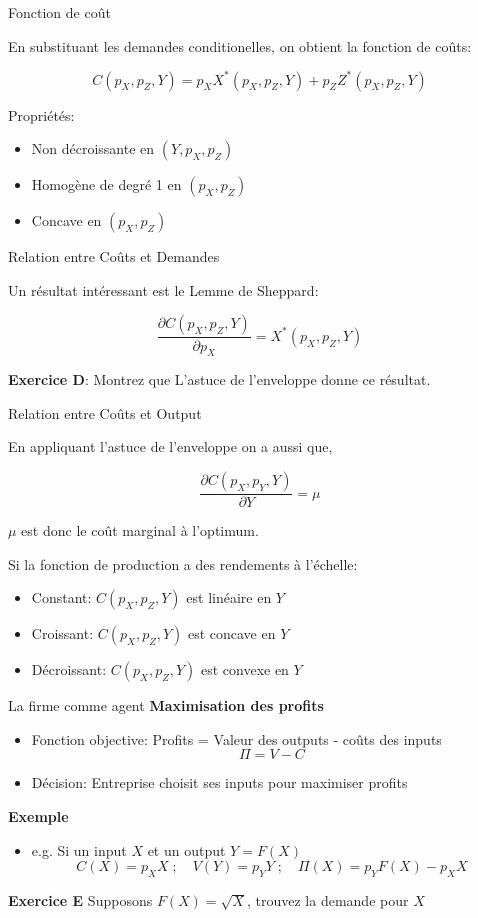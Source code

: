 \documentclass[handout]{beamer}
\newenvironment{iPar}[1]{\textbf{#1} \begin{itemize}}{\end{itemize}}
\newcommand{\mdp}{\medskip \pause}
\begin{document}
\begin{frame}{Fonction de coût} 

En substituant les demandes conditionelles, on obtient la fonction de coûts: 

$$ C(p_X,p_Z,Y) = p_X X^*(p_X,p_Z,Y) + p_Z Z^*(p_X,p_Z,Y) $$

Propriétés:
\begin{itemize}
\item Non décroissante en $(Y,p_X,p_Z)$
\item Homogène de degré 1 en $(p_X,p_Z)$
\item Concave en $(p_X,p_Z)$
\end{itemize}
\end{frame}

\begin{frame}{Relation entre Coûts et Demandes} 

Un résultat intéressant est le Lemme de Sheppard: 

$$ \frac{\partial C(p_X,p_Z,Y)}{\partial p_X} = X^*(p_X,p_Z,Y) $$

\textbf{Exercice D}: Montrez que L'astuce de l'enveloppe donne ce résultat.

\end{frame}

\begin{frame}{Relation entre Coûts et Output} 

En appliquant l'astuce de l'enveloppe on a aussi que, 

$$ \frac{\partial C(p_X,p_Y,Y)}{\partial Y} = \mu $$

$\mu$ est donc le coût marginal à l'optimum. 

\vspace{0.5in}

Si la fonction de production a des rendements à l'échelle:

\begin{itemize}
\item Constant: $C(p_X,p_Z,Y)$ est linéaire en $Y$
\item Croissant: $C(p_X,p_Z,Y)$ est concave en $Y$
\item Décroissant: $C(p_X,p_Z,Y)$ est convexe en $Y$
\end{itemize}


\end{frame}

\begin{frame}{La firme comme agent} \begin{iPar}{Maximisation des profits} \item Fonction objective:  Profits = Valeur des outputs -
coûts des inputs $$ \Pi = V - C$$ \item Décision: Entreprise choisit ses inputs pour maximiser profits \end{iPar} \mdp \begin{iPar}{Exemple} \item e.g. Si un input $X$ et un output $Y = F(X)$ $$C(X) = p_X X\;;\quad V(Y) = p_Y
Y\;;\quad \Pi(X) = p_Y F(X) - p_XX $$ 
\end{iPar}
\textbf{Exercice E} Supposons $F(X) = \sqrt X$, trouvez la demande pour $X$

\end{frame}
\end{document}
